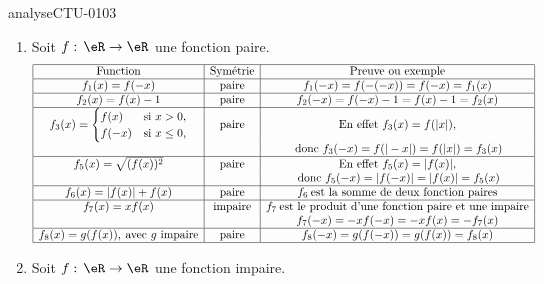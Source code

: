 
\begin{corrige}{analyseCTU-0103}

  \begin{enumerate}
  \item Soit $f:\,\eR\to\eR$ une fonction paire.
      \begin{equation*}
        \begin{array}{|c|c|c|}
         \hline
         \text{Function} & \text{Sym\'etrie} & \text{Preuve ou exemple}\\
          \hline
            f_1 (x) = f(-x) & \text{paire} & f_1 (-x) = f(-(-x)) = f(-x) = f_1(x) \\
            \hline
            f_2 (x) = f(x)-1 & \text{paire} & f_2 (-x) = f(-x)-1 =f(x)-1 = f_2(x) \\
            \hline
            f_3 (x)= 
            \begin{cases}
              f(x) &\text{si } x>0, \\
              f(-x)& \text{si } x\leq 0,
            \end{cases} &\text{paire} & \text{En effet } f_3(x) = f(|x|),\\
            && \:\text{donc } f_3(-x) = f(|-x|)= f(|x|) = f_3 (x) \\
            \hline
            f_5(x) = \sqrt{(f(x))^2} &\text{paire}& \text{En effet } f_5(x) = |f(x)|,\\
            && \:\text{donc } f_5(-x) = |f(-x)| = |f(x)| = f_5(x)\\
            \hline
            f_6(x)= |f(x)| + f(x) &\text{paire}& f_6 \: \text{est la somme de deux fonction paires} \\
            \hline
            f_7(x) = xf(x)&\text{impaire}& f_7 \: \text{est le produit d'une fonction paire et une impaire} \\
            &&f_7(-x) = -xf(-x) = -xf(x) = -f_7(x)\\
            \hline
            f_8(x) = g(f(x)), \:\text{avec $g$ impaire} &\text{paire}& f_8(-x) = g(f(-x))= g(f(x))=f_8(x) \\
\hline
        \end{array}
      \end{equation*}
\item  Soit $f:\,\eR\to\eR$ une fonction impaire.
      \begin{equation*}

\end{equation*}
\end{enumerate}
\end{corrige}
